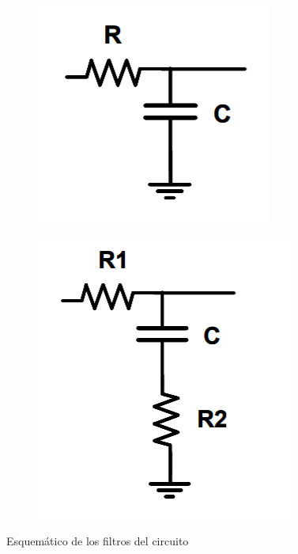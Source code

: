 \documentclass[../../tc_tp6_main.tex]{subfiles}
\begin{document}
\begin{figure}[H]	%
	\centering
	\begin{subfigure}[t]{0.35\textwidth}
		\centering
		\includegraphics[width=\textwidth]{figures/rc.png}
		\caption{}
	\end{subfigure}%
	\begin{subfigure}[t]{0.35\textwidth}
		\centering
		\includegraphics[width=\textwidth]{figures/rrc.png}
		\caption{}
	\end{subfigure}
	\caption{Esquem\'atico de los filtros del circuito}
	\label{fig:fm_rc_10k}
\end{figure}
\end{document}
